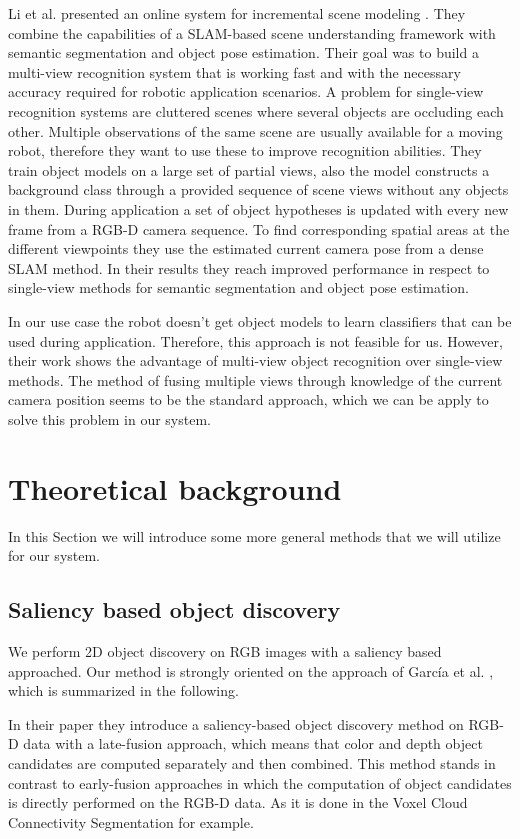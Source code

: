 \documentclass[a4paper,11pt,english]{article}
\begin{document}
Li et al. presented an online system for incremental scene modeling \cite{li2016incremental}.
They combine the capabilities of a SLAM-based scene understanding framework with semantic segmentation and object pose estimation.
Their goal was to build a multi-view recognition system that is working fast and with the necessary accuracy required for robotic application scenarios.
A problem for single-view recognition systems are cluttered scenes where several objects are occluding each other.
Multiple observations of the same scene are usually available for a moving robot, therefore they want to use these to improve recognition abilities.
They train object models on a large set of partial views, also the model constructs a background class through a provided sequence of scene views without any objects in them.
During application a set of object hypotheses is updated with every new frame from a RGB-D camera sequence.
To find corresponding spatial areas at the different viewpoints they use the estimated current camera pose from a dense SLAM method.
In their results they reach improved performance in respect to single-view methods for semantic segmentation and object pose estimation.

In our use case the robot doesn't get object models to learn classifiers that can be used during application.
Therefore, this approach is not feasible for us.
However, their work shows the advantage of multi-view object recognition over single-view methods.
The method of fusing multiple views through knowledge of the current camera position seems to be the standard approach, which we can be apply to solve this problem in our system.

\section{Theoretical background}
\label{background}
In this Section we will introduce some more general methods that we will utilize for our system.

\subsection{Saliency based object discovery}
\label{background:saliencyobjectdiscovery}
We perform 2D object discovery on RGB images with a saliency based approached.
Our method is strongly oriented on the approach of García et al. \cite{garcia2015saliency}, which is summarized in the following.

In their paper they introduce a saliency-based object discovery method on RGB-D data with a late-fusion approach, which means that color and depth object candidates are computed separately and then combined.
This method stands in contrast to early-fusion approaches in which the computation of object candidates is directly performed on the RGB-D data. As it is done in the Voxel Cloud Connectivity Segmentation \cite{papon2013voxel} for example. 
\end{document}
